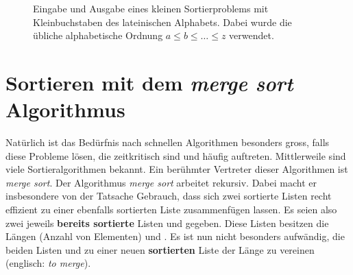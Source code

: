 \begin{figure}[H]
    \def\lvld{1.2}                  %
    \pgfmathsetmacro\shft{-6*\lvld} %
    \centering
{}
    \caption{Eingabe und Ausgabe eines kleinen Sortierproblems mit Kleinbuchstaben des lateinischen Alphabets. Dabei wurde die übliche alphabetische Ordnung $a\leq b\leq \ldots \leq z$ verwendet.}
    \label{fig:bsp2}
\end{figure}

\section{Sortieren mit dem \textit{merge sort} Algorithmus}
Natürlich ist das Bedürfnis nach schnellen Algorithmen besonders gross, falls diese Probleme lösen, die zeitkritisch sind und häufig auftreten. Mittlerweile sind viele Sortieralgorithmen bekannt. Ein berühmter Vertreter dieser Algorithmen ist \textit{merge sort}. Der Algorithmus \textit{merge sort} arbeitet rekursiv. Dabei macht er insbesondere von der Tatsache Gebrauch, dass sich zwei sortierte Listen recht effizient zu einer ebenfalls sortierten Liste zusammenfügen lassen. Es seien also zwei jeweils \textbf{bereits sortierte} Listen  und  gegeben. Diese Listen besitzen die Längen (Anzahl von Elementen)  und . Es ist nun nicht besonders aufwändig, die beiden Listen  und  zu einer neuen \textbf{sortierten} Liste  der Länge  zu vereinen (englisch: \textit{to merge}).


